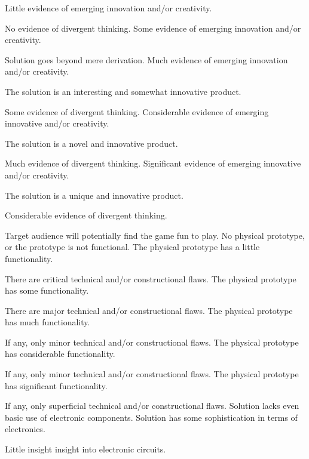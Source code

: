 \documentclass{../../fal_assignment}
\begin{document}
\begin{markingrubric}
        \grade Little evidence of emerging innovation and/or creativity.
            \par No evidence of divergent thinking.
        \grade Some evidence of emerging innovation and/or creativity.
            \par Solution goes beyond mere derivation.
        \grade Much evidence of emerging innovation and/or creativity.
            \par The solution is an interesting and somewhat innovative product.
            \par Some evidence of divergent thinking.
        \grade Considerable evidence of emerging innovative and/or creativity.
            \par The solution is a novel and innovative product.
            \par Much evidence of divergent thinking.
        \grade Significant evidence of emerging innovative and/or creativity.
            \par The solution is a unique and innovative product.
            \par Considerable evidence of divergent thinking.
            \par Target audience will potentially find the game fun to play.
%            
        \grade\fail No physical prototype, or the prototype is not functional.
        \grade The physical prototype has a little functionality.
            \par There are critical technical and/or constructional flaws.
        \grade The physical prototype has some functionality.
            \par There are major technical and/or constructional flaws.
        \grade The physical prototype has much functionality.
            \par If any, only minor technical and/or constructional flaws.
        \grade The physical prototype has considerable functionality.
            \par If any, only minor technical and/or constructional flaws.
        \grade The physical prototype has significant functionality.
            \par If any, only superficial technical and/or constructional flaws.
%
        \grade\fail Solution lacks even basic use of electronic components.
        \grade Solution has some sophistication in terms of electronics.
            \par Little insight insight into electronic circuits.

\end{markingrubric}
\end{document}
